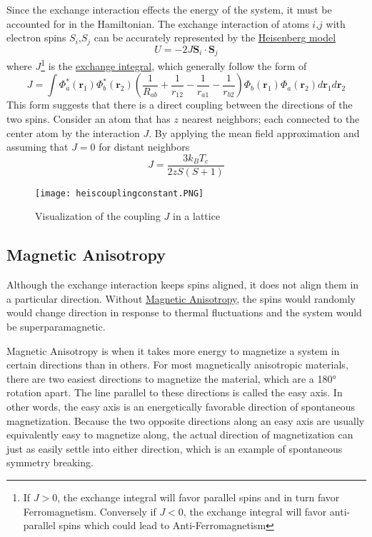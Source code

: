 \documentclass[12pt]{article}
\newcommand{\lrp}[1]{\left( #1 \right)}
\begin{document}
Since the exchange interaction effects the energy of the system, it must be accounted for in the Hamiltonian. The exchange interaction of atoms $i$,$j$ with electron spins $S_i$,$S_j$ can be accurately represented by the \href{https://en.wikipedia.org/wiki/Quantum_Heisenberg_model}{Heisenberg model}
\begin{equation}
    U = -2J\textbf{S}_i\cdot\textbf{S}_j
\end{equation}
where $J$\footnote{If $J>0$, the exchange integral will favor parallel spins and in turn favor Ferromagnetism. Conversely if $J<0$, the exchange integral will favor anti-parallel spins which could lead to Anti-Ferromagnetism} is the \href{https://en.wikipedia.org/wiki/Exchange_interaction}{exchange integral}, which generally follow the form of
\begin{equation}
    J = \int \Phi^*_a(\textbf{r}_1)\Phi^*_b(\textbf{r}_2)\lrp{\frac{1}{R_{ab}}+\frac{1}{r_{12}}-\frac{1}{r_{a1}}-\frac{1}{r_{b2}}}\Phi_b(\textbf{r}_1)\Phi_a(\textbf{r}_2)d\textbf{r}_1d\textbf{r}_2
\end{equation} 
\newpage
This form suggests that there is a direct coupling between the directions of the two spins. Consider an atom that has $z$ nearest neighbors; each connected to the center atom by the interaction $J$. By applying the mean field approximation and assuming that $J=0$ for distant neighbors
\begin{equation}
    J = \frac{3k_B T_c}{2zS(S+1)}
\end{equation}
\begin{figure}
    \centering
    \texttt{[image: heiscouplingconstant.PNG]}
    \caption{Visualization of the coupling $J$ in a lattice}
    \label{fig:Jviz}
\end{figure}
\subsection{Magnetic Anisotropy}
Although the exchange interaction keeps spins aligned, it does not align them in a particular direction. Without \href{https://en.wikipedia.org/wiki/Magnetic_anisotropy}{Magnetic Anisotropy}, the spins would randomly would change direction in response to thermal fluctuations and the system would be superparamagnetic. 

Magnetic Anisotropy is when it takes more energy to magnetize a system in certain directions than in others. For most magnetically anisotropic materials, there are two easiest directions to magnetize the material, which are a 180° rotation apart. The line parallel to these directions is called the easy axis. In other words, the easy axis is an energetically favorable direction of spontaneous magnetization. Because the two opposite directions along an easy axis are usually equivalently easy to magnetize along, the actual direction of magnetization can just as easily settle into either direction, which is an example of spontaneous symmetry breaking.
\end{document}
